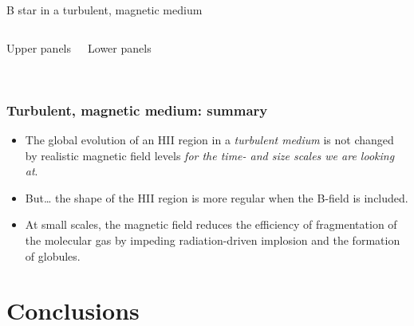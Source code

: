 \documentclass{beamer}
\begin{document}
\begin{frame}{B star in a turbulent, magnetic medium}
  \begin{columns}
    \begin{block}{Upper panels}
      \color{red}{[S\,II]}\quad
      \color{green}{[N\,II]}\quad
      \color{blue}{H\large\bfseries\begin{greek}a\end{greek}}
    \end{block}
    \begin{block}{Lower panels}
      \color{red}{FIR Cold dust}\\
      \color{green}{MIR Warm~PAHs}\\
      \color{blue}{Radio Free-free}
    \end{block}
  \end{columns}
\end{frame}

\begin{frame}
  \frametitle{Turbulent, magnetic medium: summary}
  \linespread{1.3}\selectfont
  \begin{itemize}
  \item The global evolution of an HII region in a \textit{turbulent
      medium} is not changed by 
    realistic magnetic field levels \textit{\alert{for the time- and
        size scales we are looking at}}.
  \item But\dots 
    the shape of the HII region is more regular when the B-field is included.
  \item At small scales, the magnetic field
    reduces the efficiency of fragmentation of the molecular gas by impeding
    radiation-driven implosion and the formation of globules.
  \end{itemize}
\end{frame}

\section{Conclusions}
\end{document}
